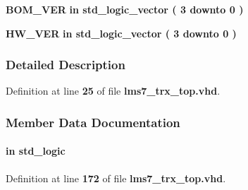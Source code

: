 \begin{DoxyCompactItemize}
{\bf B\+O\+M\+\_\+\+V\+ER}  {\bfseries {\bfseries \textcolor{keywordflow}{in}\textcolor{vhdlchar}{ }}} {\bfseries \textcolor{comment}{std\+\_\+logic\+\_\+vector}\textcolor{vhdlchar}{ }\textcolor{vhdlchar}{(}\textcolor{vhdlchar}{ }\textcolor{vhdlchar}{ } \textcolor{vhdldigit}{3} \textcolor{vhdlchar}{ }\textcolor{keywordflow}{downto}\textcolor{vhdlchar}{ }\textcolor{vhdlchar}{ } \textcolor{vhdldigit}{0} \textcolor{vhdlchar}{ }\textcolor{vhdlchar}{)}\textcolor{vhdlchar}{ }} 
\item 
{\bf H\+W\+\_\+\+V\+ER}  {\bfseries {\bfseries \textcolor{keywordflow}{in}\textcolor{vhdlchar}{ }}} {\bfseries \textcolor{comment}{std\+\_\+logic\+\_\+vector}\textcolor{vhdlchar}{ }\textcolor{vhdlchar}{(}\textcolor{vhdlchar}{ }\textcolor{vhdlchar}{ } \textcolor{vhdldigit}{3} \textcolor{vhdlchar}{ }\textcolor{keywordflow}{downto}\textcolor{vhdlchar}{ }\textcolor{vhdlchar}{ } \textcolor{vhdldigit}{0} \textcolor{vhdlchar}{ }\textcolor{vhdlchar}{)}\textcolor{vhdlchar}{ }} 
\end{DoxyCompactItemize}


\subsubsection{Detailed Description}


Definition at line {\bf 25} of file {\bf lms7\+\_\+trx\+\_\+top.\+vhd}.



\subsubsection{Member Data Documentation}
\paragraph[{A\+D\+F\+\_\+\+M\+U\+X\+O\+UT}]{ {\bfseries \textcolor{keywordflow}{in}\textcolor{vhdlchar}{ }} {\bfseries \textcolor{comment}{std\+\_\+logic}\textcolor{vhdlchar}{ }} \hspace{0.3cm}{\ttfamily [Port]}}\label{classlms7__trx__top_a4159721ab116dca7fffb151a13254615}


Definition at line {\bf 172} of file {\bf lms7\+\_\+trx\+\_\+top.\+vhd}.

